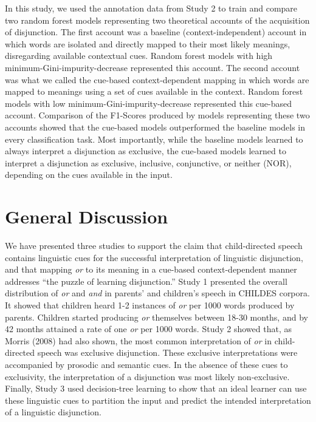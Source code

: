 \documentclass[
  english,
  ,man,floatsintext]{apa6}
\begin{document}
In this study, we used the annotation data from Study 2 to train and compare two random forest models representing two theoretical accounts of the acquisition of disjunction. The first account was a baseline (context-independent) account in which words are isolated and directly mapped to their most likely meanings, disregarding available contextual cues. Random forest models with high minimum-Gini-impurity-decrease represented this account. The second account was what we called the cue-based context-dependent mapping in which words are mapped to meanings using a set of cues available in the context. Random forest models with low minimum-Gini-impurity-decrease represented this cue-based account. Comparison of the F1-Scores produced by models representing these two accounts showed that the cue-based models outperformed the baseline models in every classification task. Most importantly, while the baseline models learned to always interpret a disjunction as exclusive, the cue-based models learned to interpret a disjunction as exclusive, inclusive, conjunctive, or neither (NOR), depending on the cues available in the input.

\hypertarget{general-discussion}{%
\section{General Discussion}\label{general-discussion}}

We have presented three studies to support the claim that child-directed speech contains linguistic cues for the successful interpretation of linguistic disjunction, and that mapping \emph{or} to its meaning in a cue-based context-dependent manner addresses ``the puzzle of learning disjunction.'' Study 1 presented the overall distribution of \emph{or} and \emph{and} in parents' and children's speech in CHILDES corpora. It showed that children heard 1-2 instances of \emph{or} per 1000 words produced by parents. Children started producing \emph{or} themselves between 18-30 months, and by 42 months attained a rate of one \emph{or} per 1000 words. Study 2 showed that, as Morris (2008) had also shown, the most common interpretation of \emph{or} in child-directed speech was exclusive disjunction. These exclusive interpretations were accompanied by prosodic and semantic cues. In the absence of these cues to exclusivity, the interpretation of a disjunction was most likely non-exclusive. Finally, Study 3 used decision-tree learning to show that an ideal learner can use these linguistic cues to partition the input and predict the intended interpretation of a linguistic disjunction.
\end{document}
